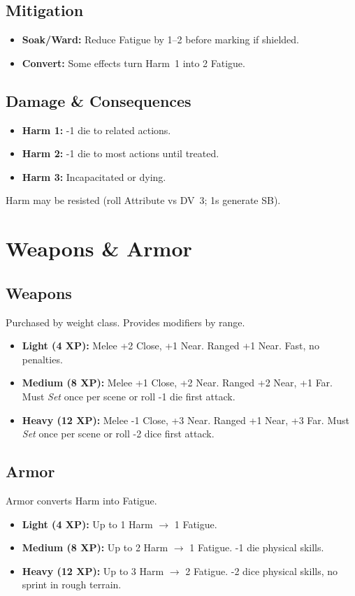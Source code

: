 \subsection*{Mitigation}
\begin{itemize}
  \item \textbf{Soak/Ward:} Reduce Fatigue by 1–2 before marking if shielded.
  \item \textbf{Convert:} Some effects turn Harm~1 into 2 Fatigue.
\end{itemize}

\subsection{Damage \& Consequences}
\begin{itemize}
  \item \textbf{Harm 1:} -1 die to related actions.
  \item \textbf{Harm 2:} -1 die to most actions until treated.
  \item \textbf{Harm 3:} Incapacitated or dying.
\end{itemize}
Harm may be resisted (roll Attribute vs DV~3; 1s generate SB).

\section{Weapons \& Armor}
\label{sec:weapons-armor}

\subsection*{Weapons}
Purchased by weight class. Provides modifiers by range.
\begin{itemize}
  \item \textbf{Light (4 XP):} Melee +2 Close, +1 Near. Ranged +1 Near. Fast, no penalties.
  \item \textbf{Medium (8 XP):} Melee +1 Close, +2 Near. Ranged +2 Near, +1 Far. Must \emph{Set} once per scene or roll -1 die first attack.
  \item \textbf{Heavy (12 XP):} Melee -1 Close, +3 Near. Ranged +1 Near, +3 Far. Must \emph{Set} once per scene or roll -2 dice first attack.
\end{itemize}

\subsection*{Armor}
Armor converts Harm into Fatigue.
\begin{itemize}
  \item \textbf{Light (4 XP):} Up to 1 Harm $\rightarrow$ 1 Fatigue.
  \item \textbf{Medium (8 XP):} Up to 2 Harm $\rightarrow$ 1 Fatigue. -1 die physical skills.
  \item \textbf{Heavy (12 XP):} Up to 3 Harm $\rightarrow$ 2 Fatigue. -2 dice physical skills, no sprint in rough terrain.
\end{itemize}

